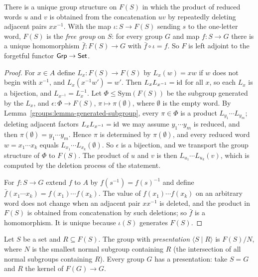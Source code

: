 \begin{theorem}\label{groups:theorem-free-group}
There is a unique group structure on $F(S)$ in which the product of reduced words
$u$ and $v$ is obtained from the concatenation $uv$ by repeatedly deleting adjacent
pairs $x x^{-1}$. With the map $\iota \colon S \to F(S)$ sending $s$ to the one-letter
word, $F(S)$ is the \emph{free group} on $S$: for every group $G$ and map
$f \colon S \to G$ there is a unique homomorphism $\bar f \colon F(S) \to G$ with
$\bar f \circ \iota = f$. So $F$ is left adjoint to the forgetful functor
$\mathsf{Grp} \to \mathsf{Set}$.
\end{theorem}

\begin{proof}
For $x \in A$ define $L_x \colon F(S) \to F(S)$ by $L_x(w) = xw$ if $w$ does not begin
with $x^{-1}$, and $L_x(x^{-1}w') = w'$. Then $L_x L_{x^{-1}} = \mathrm{id}$ for all $x$, so each
$L_x$ is a bijection, and $L_{x^{-1}} = L_x^{-1}$. Let $\Phi \leq \mathrm{Sym}(F(S))$ be the
subgroup generated by the $L_x$, and $\epsilon \colon \Phi \to F(S)$, $\pi \mapsto \pi(\emptyset)$,
where $\emptyset$ is the empty word. By Lemma~\ref{groups:lemma-generated-subgroup}, every
$\pi \in \Phi$ is a product $L_{y_1} \cdots L_{y_m}$; deleting adjacent factors
$L_x L_{x^{-1}} = \mathrm{id}$ we may assume $y_1 \cdots y_m$ is reduced, and then
$\pi(\emptyset) = y_1 \cdots y_m$. Hence $\pi$ is determined by $\pi(\emptyset)$, and every reduced
word $w = x_1 \cdots x_k$ equals $L_{x_1} \cdots L_{x_k}(\emptyset)$. So $\epsilon$ is a bijection, and we
transport the group structure of $\Phi$ to $F(S)$. The product of $u$ and $v$ is then
$L_{u_1} \cdots L_{u_k}(v)$, which is computed by the deletion process of the
statement.

For $f \colon S \to G$ extend $f$ to $A$ by $f(s^{-1}) = f(s)^{-1}$ and define
$\bar f(x_1 \cdots x_k) = f(x_1) \cdots f(x_k)$. The value of $f(x_1)\cdots f(x_k)$ on an
arbitrary word does not change when an adjacent pair $x x^{-1}$ is deleted, and the
product in $F(S)$ is obtained from concatenation by such deletions; so $\bar f$ is a
homomorphism. It is unique because $\iota(S)$ generates $F(S)$.
\end{proof}

\begin{definition}\label{groups:definition-presentation}
Let $S$ be a set and $R \subseteq F(S)$. The group with \emph{presentation}
$\langle S \mid R \rangle$ is $F(S)/N$, where $N$ is the smallest normal subgroup containing $R$
(the intersection of all normal subgroups containing $R$). Every group $G$ has a
presentation: take $S = G$ and $R$ the kernel of $F(G) \to G$.
\end{definition}

